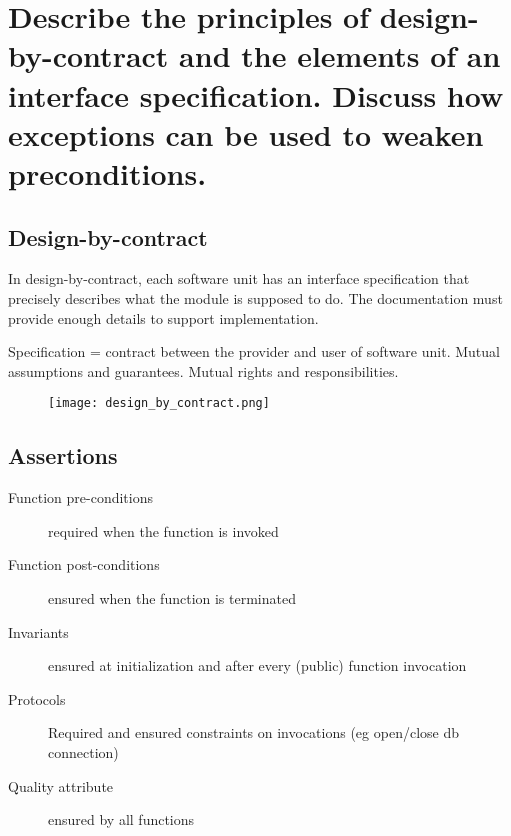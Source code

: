 \clearpage{}
\section{Describe the principles of design-by-contract and the elements
of an interface specification. Discuss how exceptions can be used to
weaken preconditions.}


\subsection{Design-by-contract}
In design-by-contract, each software unit has an interface specification that precisely
describes what the module is supposed to do. The documentation must provide enough
details to support implementation. \newline

Specification = contract between the provider and user of software unit. \newline
Mutual assumptions and guarantees. \newline
Mutual rights and responsibilities. \newline

\begin{figure}[!ht]
    \centering
    \texttt{[image: design\_by\_contract.png]}
\end{figure}

\subsection{Assertions}

\begin{description}
    \item[Function pre-conditions] required when the function is invoked
    \item[Function post-conditions] ensured when the function is terminated
    \item[Invariants] ensured at initialization and after every (public) function invocation
    \item[Protocols] Required and ensured constraints on invocations (eg open/close db connection)
    \item[Quality attribute] ensured by all functions
\end{description}

